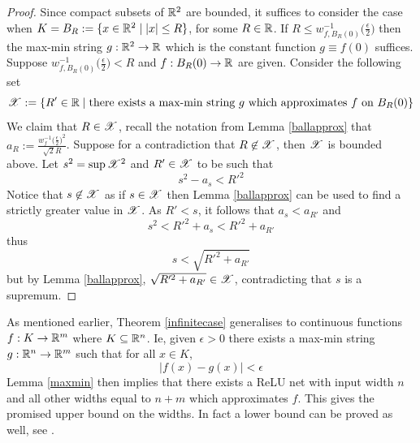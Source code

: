 \begin{proof}
Since compact subsets of $\mathbb{R}^2$ are bounded, it suffices to consider the case when $K = B_R := \lbrace x \in \mathbb{R}^2 \mid |x| \leq R\rbrace$, for some $R \in \mathbb{R}$. If $R \leq w_{f,B_{R}(0)}^{-1}\big(\frac{\epsilon}{2}\big)$ then the max-min string $g: \mathbb{R}^2 \to \mathbb{R}$ which is the constant function $g \equiv f(0)$ suffices. Suppose $w_{f,B_{R}(0)}^{-1}\big(\frac{\epsilon}{2}\big) < R$ and $f: B_R(0) \to \mathbb{R}$ are given. Consider the following set
\[\mathscr{X} := \lbrace R' \in \mathbb{R} \mid \text{there exists a max-min string } g\text{ which approximates }f\text{ on }B_{R}(0)\rbrace\]
We claim that $R \in \mathscr{X}$, recall the notation from Lemma \ref{ballapprox} that $a_R := \frac{w_f^{-1}\big(\frac{\epsilon}{2}\big)^2}{\sqrt{2}R}$. Suppose for a contradiction that $R \not\in \mathscr{X}$, then $\mathscr{X}$ is bounded above. Let $s^2 = \sup\mathscr{X}^2$ and $R' \in \mathscr{X}$ to be such that
\[s^2 - a_s < R'^2\]
Notice that $s \not\in \mathscr{X}$ as if $s \in \mathscr{X}$ then Lemma \ref{ballapprox} can be used to find a strictly greater value in $\mathscr{X}$. As $R' < s$, it follows that $a_s < a_{R'}$ and
\[s^2 < R'^2 + a_s < R'^2 + a_{R'}\]
thus
\[s < \sqrt{R'^2 + a_{R'}}\]
but by Lemma \ref{ballapprox}, $\sqrt{R'^2 + a_{R'}} \in \mathscr{X}$, contradicting that $s$ is a supremum.
\end{proof}

\begin{remark}
\label{bound}
As mentioned earlier, Theorem \ref{infinitecase} generalises to continuous functions $f: K \to \mathbb{R}^m$ where $K \subseteq \mathbb{R}^n$. Ie, given $\epsilon > 0$ there exists a max-min string $g: \mathbb{R}^n \to \mathbb{R}^m$ such that for all $x \in K$,
\[|f(x) - g(x)| < \epsilon\]
Lemma \ref{maxmin} then implies that there exists a ReLU net with input width $n$ and all other widths equal to $n + m$ which approximates $f$. This gives the promised upper bound on the widths. In fact a lower bound can be proved as well, see \cite[\S 3]{Hanin}.
\end{remark}